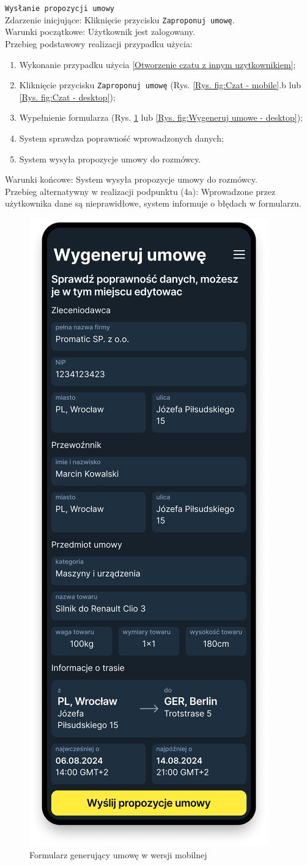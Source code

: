\texttt{Wysłanie propozycji umowy} \\
Zdarzenie inicjujące: Kliknięcie przycisku \texttt{Zaproponuj umowę}. \\
Warunki początkowe: Użytkownik jest zalogowany.\\
Przebieg podstawowy realizacji przypadku użycia:\\
\begin{enumerate}
    \item Wykonanie przypadku użycia \ref{Otworzenie czatu z innym uzytkownikiem};
    \item Kliknięcie przycisku \texttt{Zaproponuj umowę} (Rys. \ref{Rys. fig:Czat - mobile}.b lub \ref{Rys. fig:Czat - desktop});
    \item Wypełnienie formularza (Rys. \ref{Rys. fig:Wygeneruj umowe - mobile} lub \ref{Rys. fig:Wygeneruj umowe - desktop});
    \item System sprawdza poprawność wprowadzonych danych;
    \item System wysyła propozycje umowy do rozmówcy.
\end{enumerate}
Warunki końcowe: System wysyła propozycje umowy do rozmówcy.\\
Przebieg alternatywny w realizacji podpunktu (4a): Wprowadzone przez użytkownika dane są nieprawidłowe, system informuje o błędach w formularzu.\\
\begin{figure}[H]
	\centering
		\includegraphics[width=0.3\linewidth]{rozdzial1/wygneruj_umowe_m.png}
	\caption{Formularz generujący umowę w wersji mobilnej}
	\label{Rys. fig:Wygeneruj umowe - mobile}
\end{figure}
